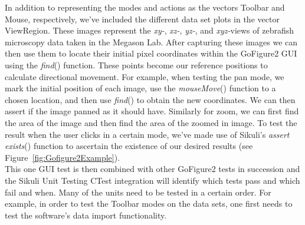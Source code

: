 \documentclass{InsightArticle}
\begin{document}
In addition to representing the modes and actions
as the vectors Toolbar and Mouse, respectively, we've included the different data set plots in the vector ViewRegion.  
These images represent the  \emph{xy-},  \emph{xz-},  \emph{yz-}, and  \emph{xyz-}views of zebrafish microscopy data taken in the Megason Lab.  After capturing
these images we can then use them to locate their initial pixel coordinates within the GoFigure2 GUI using the \emph{find}() function.  These points become 
our reference positions to calculate directional movement.  For example, when testing the pan mode, we mark the initial position of each image,
use the \emph{mouseMove}() function to a chosen location, and then use \emph{find}() to obtain the new coordinates.  We can then assert if the image panned as it should have.
Similarly for zoom, we can first find the area of the image and then find the area of the zoomed in image.  To test the result when the user clicks 
in a certain mode, we've made use of Sikuli's \emph{assert exists}() function to ascertain the existence of our
desired results   (see Figure~\ref{fig:Gofigure2Example}).\\

This one GUI test is then combined with other GoFigure2 tests in succession and the Sikuli Unit Testing CTest integration will identify
which tests pass and which fail and when. Many of the units need to be tested in a certain order.  For example, in order to test the Toolbar modes
on the data sets, one first needs to test the software's data import functionality.
\end{document}
